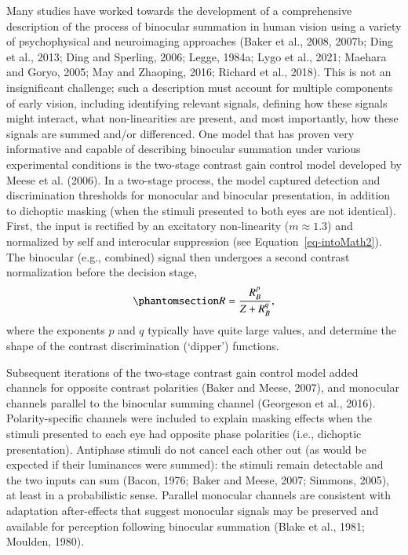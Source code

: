 \documentclass[review,
  12pt,
]{elsarticle}
\begin{document}
Many studies have worked towards the development of a comprehensive
description of the process of binocular summation in human vision using
a variety of psychophysical and neuroimaging approaches (Baker et al.,
2008, 2007b; Ding et al., 2013; Ding and Sperling, 2006; Legge, 1984a;
Lygo et al., 2021; Maehara and Goryo, 2005; May and Zhaoping, 2016;
Richard et al., 2018). This is not an insignificant challenge; such a
description must account for multiple components of early vision,
including identifying relevant signals, defining how these signals might
interact, what non-linearities are present, and most importantly, how
these signals are summed and/or differenced. One model that has proven
very informative and capable of describing binocular summation under
various experimental conditions is the two-stage contrast gain control
model developed by Meese et al. (2006). In a two-stage process, the
model captured detection and discrimination thresholds for monocular and
binocular presentation, in addition to dichoptic masking (when the
stimuli presented to both eyes are not identical). First, the input is
rectified by an excitatory non-linearity (\(m \approx 1.3\)) and
normalized by self and interocular suppression (see
Equation~\ref{eq-intoMath2}). The binocular (e.g., combined) signal then
undergoes a second contrast normalization before the decision stage,
\begin{equation}\phantomsection\label{eq-IntroMathSecondStage}{
R = \frac{R_B^p}{Z + R_B^q},
}\end{equation} where the exponents \(p\) and \(q\) typically have quite
large values, and determine the shape of the contrast discrimination
(`dipper') functions.

Subsequent iterations of the two-stage contrast gain control model added
channels for opposite contrast polarities (Baker and Meese, 2007), and
monocular channels parallel to the binocular summing channel (Georgeson
et al., 2016). Polarity-specific channels were included to explain
masking effects when the stimuli presented to each eye had opposite
phase polarities (i.e., dichoptic presentation). Antiphase stimuli do
not cancel each other out (as would be expected if their luminances were
summed): the stimuli remain detectable and the two inputs can sum
(Bacon, 1976; Baker and Meese, 2007; Simmons, 2005), at least in a
probabilistic sense. Parallel monocular channels are consistent with
adaptation after-effects that suggest monocular signals may be preserved
and available for perception following binocular summation (Blake et
al., 1981; Moulden, 1980).
\end{document}
